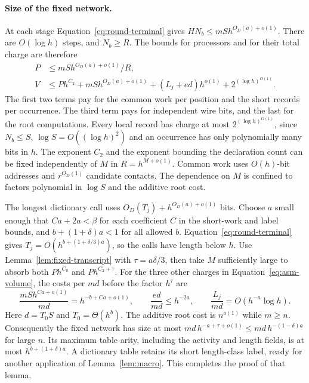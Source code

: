 \paragraph{Size of the fixed network.}
At each stage Equation~\eqref{eq:round-terminal} gives
$HN_b\le mS h^{O_D(a)+o(1)}$. There are $O(\log h)$ steps, and
$N_b\ge R$. The bounds for processors and for their total charge are
therefore
\begin{align}
 P&\le mS h^{O_D(a)+o(1)}/R,\nonumber\\
 V&\le P h^{C_2}+mS h^{O_D(a)+o(1)}
     +(L_j+ed)h^{o(1)}+2^{(\log h)^{O(1)}}.\label{eq:asm-volume}
\end{align}
The first two terms pay for the common work per position and the
short records per occurrence. The third term pays for independent
wire bits, and the last for the root computations. Every local
record has charge at most $2^{(\log h)^{O(1)}}$, since $N_b\le S$,
$\log S=O((\log h)^2)$ and an occurrence has only polynomially many
bits in $h$. The exponent $C_2$ and the exponent bounding the
declaration count can be fixed independently of $M$ in
$R=h^{M+o(1)}$. Common work uses $O(h)$-bit addresses and
$r^{O_D(1)}$ candidate contacts. The dependence on $M$ is confined
to factors polynomial in $\log S$ and the additive root cost.

The longest dictionary call uses $O_D(T_j)+h^{O_D(a)+o(1)}$ bits.
Choose $a$ small enough that $Ca+2a<\beta$ for each coefficient $C$
in the short-work and label bounds, and $b+(1+\delta)a<1$ for all
allowed $b$. Equation~\eqref{eq:round-terminal} gives
$T_j=O(h^{b+(1+\delta/3)a})$, so the calls have length below $h$.
Use Lemma~\ref{lem:fixed-transcript} with $\tau=a\delta/3$, then
take $M$ sufficiently large to absorb both $P h^{C_0}$ and
$P h^{C_2+\tau}$. For the three other charges in
Equation~\eqref{eq:asm-volume}, the costs per $md$ before the
factor $h^\tau$ are
\[
 \frac{mS h^{Ca+o(1)}}{md}=h^{-b+Ca+o(1)},\qquad
 \frac{ed}{md}\le h^{-2a},\qquad
 \frac{L_j}{md}=O(h^{-a}\log h).
\]
Here $d=T_0S$ and $T_0=\Theta(h^b)$. The additive root cost is
$n^{o(1)}$ while $m\ge n$. Consequently the fixed network has size
at most $md\,h^{-a+\tau+o(1)}\le md\,h^{-(1-\delta)a}$ for
large $n$. Its maximum table arity, including the activity and
length fields, is at most $h^{b+(1+\delta)a}$. A dictionary table
retains its short length-class label, ready for another application
of Lemma~\ref{lem:macro}. This completes the proof of that lemma.
